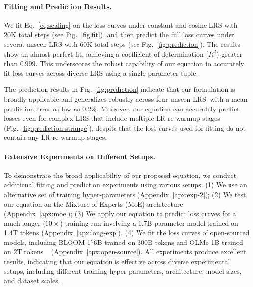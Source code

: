 \paragraph{Fitting and Prediction Results.}
We fit Eq.~\ref{eq:scaling} on the loss curves under constant and cosine LRS with 20K total steps (see Fig.~\ref{fig:fit}), and then predict the full loss curves under several unseen LRS with 60K total steps (see Fig.~\ref{fig:prediction}). The results show an almost perfect fit, achieving a coefficient of determination ($R^2$) greater than $0.999$. This underscores the robust capability of our equation to accurately fit loss curves across diverse LRS using a single parameter tuple.

The prediction results in Fig.~\ref{fig:prediction} indicate that our formulation is broadly applicable and  generalizes robustly across four unseen LRS, with a mean prediction error as low as 0.2\%. Moreover, our equation can accurately predict losses even for complex LRS that include multiple LR re-warmup stages (Fig.~\ref{fig:prediction-strange}), despite that the loss curves used for fitting do not contain any LR re-warmup stages.

\paragraph{Extensive Experiments on Different Setups.}
To demonstrate the broad applicability of our proposed equation, we conduct additional fitting and prediction experiments using various setups. (1) We use an alternative set of training hyper-parameters (Appendix~\ref{apx:exp-2}); (2) We test our equation on the Mixture of Experts (MoE) architecture (Appendix~\ref{apx:moe}); (3) We apply our equation to predict loss curves for a much longer ($10\times$) training run involving a 1.7B parameter model trained on 1.4T tokens (Appendix~\ref{apx:long-exp}).
(4) We fit the loss curves of open-sourced models, including BLOOM-176B trained on 300B tokens \citep{workshop2022bloom} and OLMo-1B trained on 2T tokens ~\citep{groeneveld2024olmo} (Appendix~\ref{apx:open-source}).
All experiments produce excellent results, indicating that our equation is effective across diverse experimental setups, including different training hyper-parameters, architecture, model sizes, and dataset scales.

